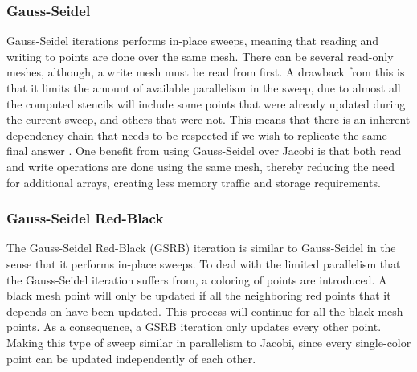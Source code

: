\subsubsection{Gauss-Seidel}
Gauss-Seidel iterations performs in-place sweeps, meaning that reading and writing to points are done over the same mesh. There can be several read-only meshes, although, a write mesh must be read from first. A drawback from this is that it limits the amount of available parallelism in the sweep, due to almost all the computed stencils will include some points that were already updated during the current sweep, and others that were not. This means that there is an inherent dependency chain that needs to be respected if we wish to replicate the same final answer \cite{article9}. One benefit from using Gauss-Seidel over Jacobi is that both read and write operations are done using the same mesh, thereby reducing the need for additional arrays, creating less memory traffic and storage requirements. 

\subsubsection{Gauss-Seidel Red-Black}
The Gauss-Seidel Red-Black (GSRB) iteration is similar to Gauss-Seidel in the sense that it performs in-place sweeps. To deal with the limited parallelism that the Gauss-Seidel iteration suffers from, a coloring of points are introduced. A black mesh point will only be updated if all the neighboring red points that it depends on have been updated. This process will continue for all the black mesh points. As a consequence, a GSRB iteration only updates every other point. Making this type of sweep similar in parallelism to Jacobi, since every single-color point can be updated independently of each other.



